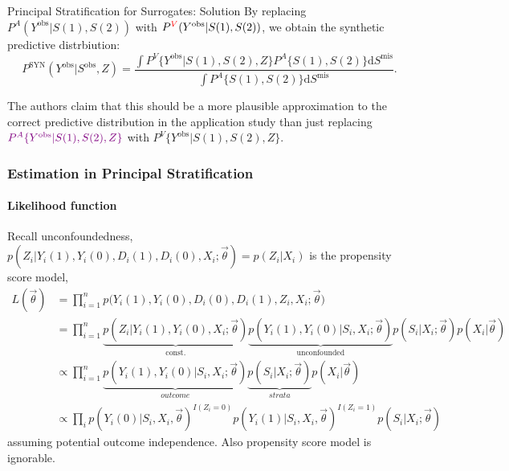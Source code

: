 \documentclass[10pt]{beamer}
\newcommand{\zuokh}{\Big (}
\newcommand{\youkh}{\Big )}
\begin{document}
\begin{frame}{Principal Stratification for Surrogates: Solution}
By replacing $P^A(Y^\text{obs}|S(1), S(2))$ with $P^{\color{red} V} (Y^\text{obs}|S(1), S(2))$, we obtain the synthetic predictive distrbiution: 
$$
P^\text{SYN}(Y^\text{obs}|S^\text{obs},Z) = 
\frac{\int P^V\{ Y^\text{obs}|S(1), S(2), Z \} P^A\{ S(1), S(2) \} \mathrm dS^\text{mis}}{
\int P^A\{ S(1), S(2) \} \mathrm dS^\text{mis} 
}.
$$

The authors claim that this should be a more plausible approximation
to the correct predictive distribution in the application study than 
just replacing ${\color{violet} P^A\{Y^\text{obs} | S(1), S(2), Z \}}$
with $P^V\{ Y^\text{obs} | S(1), S(2), Z \}$. 
\end{frame}

\begin{frame}
\footnotesize 
\frametitle{Estimation in Principal Stratification}
\framesubtitle{Likelihood function}
Recall unconfoundedness, $p( Z_i | Y_i(1), Y_i(0),D_i(1), D_i(0),X_i; \vec{\theta} )=p(Z_i|X_i)$ is the propensity score model,
\begin{align*}
	L(\vec{\theta })&=\prod^n_{i=1}p\zuokh Y_i(1), Y_i(0), D_i(0), D_i(1), Z_i,X_i; \vec{\theta} \youkh \\
	&= \prod^n_{i=1}\underbrace{p( Z_i | Y_i(1), Y_i(0),X_i; \vec{\theta} )}_{\text{const.}} \underbrace{p(  Y_i(1), Y_i(0)  |S_i, X_i; \vec{\theta}) }_{\text{unconfounded}}  p( S_i  | X_i; \vec{\theta})  p( X_i |\vec{\theta}) \\
	&\propto \prod^n_{i=1}\underbrace{p(  Y_i(1), Y_i(0)  |S_i, X_i; \vec{\theta})}_{outcome}   \underbrace{p( S_i  | X_i; \vec{\theta})}_{strata}  p( X_i |\vec{\theta})\\
	&\propto \prod_i p(Y_i(0)|S_i,X_i, \vec{\theta} )^{I(Z_i=0)}p(Y_i(1)|S_i,X_i, \vec{\theta} )^{I(Z_i=1)}p( S_i  | X_i; \vec{\theta})
\end{align*}
assuming potential outcome independence. Also  propensity score model is ignorable.
\end{frame}
         
\end{document}
